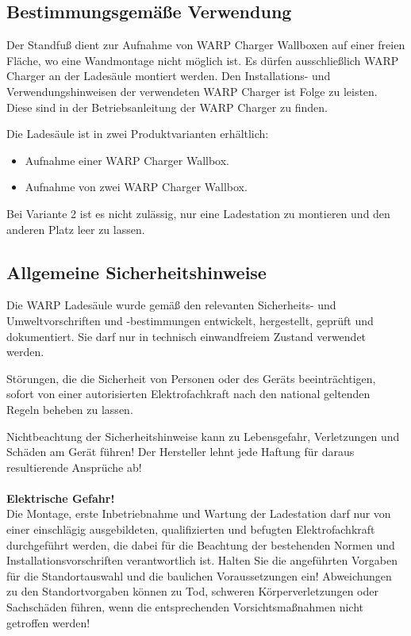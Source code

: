 \documentclass[a4paper,10pt]{article}
\newcommand{\warn}[1]{\begin{tcolorbox}[colback=boxred,colframe=red,coltext=
white,title=Warnung]#1\end{tcolorbox}}
\begin{document}
\begin{multicols*}{2}
	\subsection{Bestimmungsgemäße Verwendung}
	Der Standfuß dient zur Aufnahme von WARP Charger Wallboxen auf einer freien Fläche, wo eine
	Wandmontage nicht möglich ist. Es dürfen ausschließlich WARP Charger
	an der Ladesäule montiert werden. Den Installations- und
	Verwendungshinweisen der verwendeten WARP Charger ist Folge zu leisten.
	Diese sind in der Betriebsanleitung der WARP Charger zu finden.

	Die Ladesäule ist in zwei Produktvarianten erhältlich:
	\begin{itemize}
		\item Aufnahme einer WARP Charger Wallbox.
		\item Aufnahme von zwei WARP Charger Wallbox.
	\end{itemize}

	Bei Variante 2 ist es nicht zulässig, nur eine Ladestation zu montieren und den anderen Platz leer zu lassen.

	\subsection{Allgemeine Sicherheitshinweise}

	Die WARP Ladesäule wurde gemäß den relevanten Sicherheits- und Umweltvorschriften und -bestimmungen
	entwickelt, hergestellt, geprüft und dokumentiert. Sie darf nur in technisch einwandfreiem Zustand verwendet werden.

	Störungen, die die Sicherheit von Personen oder des Geräts beeinträchtigen,
	sofort von einer autorisierten Elektrofachkraft nach den national geltenden Regeln beheben zu lassen.

	\warn{Nichtbeachtung der Sicherheitshinweise kann zu Lebensgefahr,
	Verletzungen und Schäden am Gerät führen! Der Hersteller lehnt jede Haftung
	für daraus resultierende Ansprüche ab!
	\\
	\\
	\textbf{Elektrische Gefahr!}\\
	Die Montage, erste Inbetriebnahme und Wartung der Ladestation darf nur von einer einschlägig ausgebildeten, qualifizierten und befugten Elektrofachkraft durchgeführt werden, die dabei für die Beachtung der bestehenden Normen und Installationsvorschriften verantwortlich ist. Halten Sie die angeführten Vorgaben für die Standortauswahl und die baulichen Voraussetzungen ein! Abweichungen zu den Standortvorgaben können zu Tod, schweren Körperverletzungen oder Sachschäden führen, wenn die entsprechenden Vorsichtsmaßnahmen nicht getroffen werden!
	}


\end{multicols*}
\end{document}
